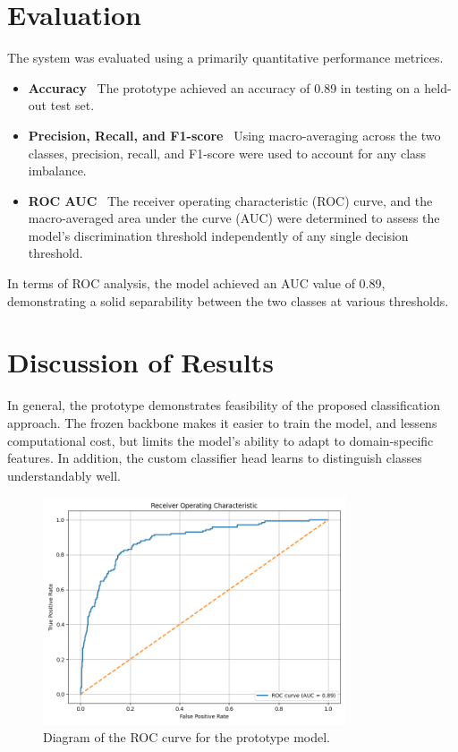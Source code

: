 \documentclass[../main]{subfiles}
\begin{document}
\section{Evaluation}
The system was evaluated using a primarily quantitative performance metrices.

\begin{itemize}
	\item \textbf{Accuracy} \textemdash\ The prototype achieved an accuracy of 0.89 in testing on a held-out test set.
	\item \textbf{Precision, Recall, and F1-score} \textemdash\ Using macro-averaging across the two classes, precision, recall, and F1-score were used to account for any class imbalance.
	\item \textbf{ROC AUC} \textemdash\ The receiver operating characteristic (ROC) curve, and the macro-averaged area under the curve (AUC) were determined to assess the model's discrimination threshold independently of any single decision threshold.
\end{itemize}

\noindent In terms of ROC analysis, the model achieved an AUC value of 0.89, demonstrating a solid separability between the two classes at various thresholds.

\section{Discussion of Results}
In general, the prototype demonstrates feasibility of the proposed classification approach. The frozen backbone makes it easier to train the model, and lessens computational cost, but limits the model's ability to adapt to domain-specific features. In addition, the custom classifier head learns to distinguish classes understandably well.

\begin{figure}[h]
	\centering
	\includegraphics[width=0.8\textwidth]{assets/roc.png}
	\caption{Diagram of the ROC curve for the prototype model.}
	\label{fig:prototype_architecture}
\end{figure}
\end{document}
